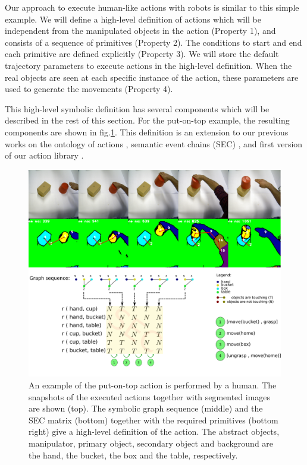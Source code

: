 Our approach to execute human-like actions with robots is similar to this simple example.
We will define a high-level definition of actions which will be independent from the manipulated objects in the action (Property 1),
and consists of a sequence of primitives (Property 2).
The conditions to start and end each primitive are defined explicitly (Property 3).
We will store the default trajectory parameters to execute actions in the high-level definition.
When the real objects are seen at each specific instance of the action, these parameters are used to generate the movements (Property 4).


This high-level symbolic definition has several components which will be described in the rest of this section.
For the put-on-top example, the resulting components are shown in fig.\ref{fig:action_graph_sec}.
This definition is an extension to our previous works on the ontology of actions \cite{TAMD13}, semantic event chains (SEC) \cite{Aksoy2011b},
and first version of our action library \cite{aein2013toward}.
\begin{figure}
      \centering
      \includegraphics[scale=0.20]{./pdf/action_graph_sec.pdf}
      \caption{ An example of the put-on-top action is performed by a human. 
The snapshots of the executed actions together with segmented images are shown (top).
The symbolic graph sequence (middle) and the SEC matrix (bottom) together with 
the required primitives (bottom right) give a high-level definition of the action.
The abstract objects, manipulator, primary object, secondary object and background are the hand, the bucket, the box and the table, respectively.}
      \label{fig:action_graph_sec}
\end{figure}



